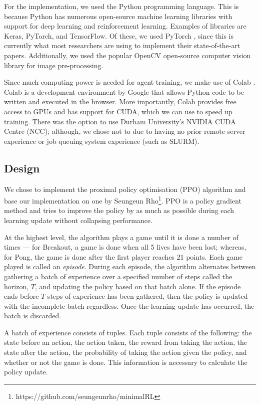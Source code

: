 \documentclass[12pt,a4paper]{article}
\begin{document}
For the implementation, we used the Python programming language. This is because Python has numerous open-source machine learning libraries with support for deep learning and reinforcement learning. Examples of libraries are Keras, PyTorch, and TensorFlow. Of these, we used PyTorch \cite{NEURIPS2019_9015}, since this is currently what most researchers are using to implement their state-of-the-art papers. Additionally, we used the popular OpenCV \cite{opencv_library} open-source computer vision library for image pre-processing.

Since much computing power is needed for agent-training, we make use of Colab \cite{}. Colab is a development environment by Google that allows Python code to be written and executed in the browser. More importantly, Colab provides free access to GPUs and has support for CUDA, which we can use to speed up training. There was the option to use Durham University's NVIDIA CUDA Centre (NCC); although, we chose not to due to having no prior remote server experience or job queuing system experience (such as SLURM).

\subsection{Design}
We chose to implement the proximal policy optimisation (PPO) algorithm \cite{DBLP:journals/corr/SchulmanWDRK17} and base our implementation on one by Seungeun Rho\footnote{https://github.com/seungeunrho/minimalRL}. PPO is a policy gradient method and tries to improve the policy by as much as possible during each learning update without collapsing performance. 

At the highest level, the algorithm plays a game until it is done a number of times --- for Breakout, a game is done when all 5 lives have been lost; whereas, for Pong, the game is done after the first player reaches 21 points. Each game played is called an \emph{episode}. During each episode, the algorithm alternates between gathering a batch of experience over a specified number of steps called the horizon, $T$, and updating the policy based on that batch alone. If the episode ends before $T$ steps of experience has been gathered, then the policy is updated with the incomplete batch regardless. Once the learning update has occurred, the batch is discarded.  

A batch of experience consists of tuples. Each tuple consists of the following: the state before an action, the action taken, the reward from taking the action, the state after the action, the probability of taking the action given the policy, and whether or not the game is done. This information is necessary to calculate the policy update.
\end{document}

